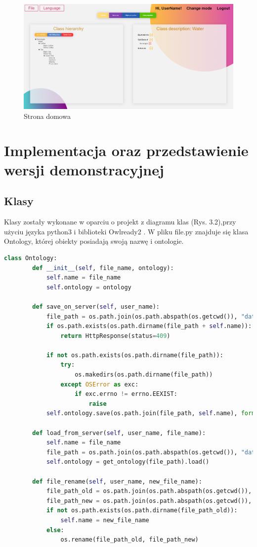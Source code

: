 \documentclass[a4paper,12pt, twoside]{book} %
\begin{document}
\begin{figure}[h]
	\centering
	\includegraphics[scale=0.31]{main_page.png}
	\caption{Strona domowa}
\end{figure}

\chapter{Implementacja oraz przedstawienie wersji demonstracyjnej}
\section{Klasy}
Klasy zostały wykonane w oparciu o projekt z diagramu klas (Rys. 3.2),przy użyciu języka python3 \cite{python} i biblioteki Owlready2 \cite{owlready2}. W pliku file.py znajduje się klasa Ontology, której obiekty posiadają swoją nazwę i ontologie.
\begin{lstlisting}[language=Python, basicstyle=\small, breaklines=true, caption={Przykładowe metody klasy Ontology},  label={lst:class}]
	class Ontology:
		def __init__(self, file_name, ontology):
			self.name = file_name
			self.ontology = ontology
		
		def save_on_server(self, user_name):
			file_path = os.path.join(os.path.abspath(os.getcwd()), "data", user_name, "")
			if os.path.exists(os.path.dirname(file_path + self.name)):
				return HttpResponse(status=409)
		
			if not os.path.exists(os.path.dirname(file_path)):
				try:
					os.makedirs(os.path.dirname(file_path))
				except OSError as exc:
					if exc.errno != errno.EEXIST:
						raise
			self.ontology.save(os.path.join(file_path, self.name), format="rdfxml")
		
		def load_from_server(self, user_name, file_name):
			self.name = file_name
			file_path = os.path.join(os.path.abspath(os.getcwd()), "data", user_name, file_name)
			self.ontology = get_ontology(file_path).load()
		
		def file_rename(self, user_name, new_file_name):
			file_path_old = os.path.join(os.path.abspath(os.getcwd()), "data", user_name, self.name)
			file_path_new = os.path.join(os.path.abspath(os.getcwd()), "data", user_name, new_file_name)
			if not os.path.exists(os.path.dirname(file_path_old)):
				self.name = new_file_name
			else:
				os.rename(file_path_old, file_path_new)
\end{lstlisting}
\end{document}
